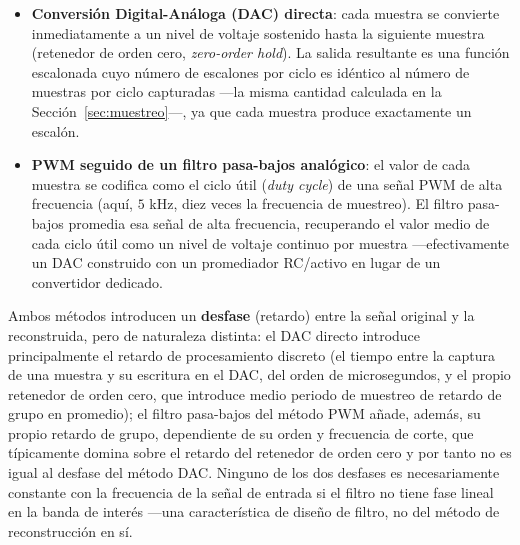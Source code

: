 \begin{itemize}
\item \textbf{Conversión Digital-Análoga (DAC) directa}: cada muestra se convierte inmediatamente a un nivel de voltaje sostenido hasta la siguiente muestra (retenedor de orden cero, \emph{zero-order hold}). La salida resultante es una función escalonada cuyo número de escalones por ciclo es idéntico al número de muestras por ciclo capturadas —la misma cantidad calculada en la Sección~\ref{sec:muestreo}—, ya que cada muestra produce exactamente un escalón.
\item \textbf{PWM seguido de un filtro pasa-bajos analógico}: el valor de cada muestra se codifica como el ciclo útil (\emph{duty cycle}) de una señal PWM de alta frecuencia (aquí, $5$ kHz, diez veces la frecuencia de muestreo). El filtro pasa-bajos promedia esa señal de alta frecuencia, recuperando el valor medio de cada ciclo útil como un nivel de voltaje continuo por muestra —efectivamente un DAC construido con un promediador RC/activo en lugar de un convertidor dedicado.
\end{itemize}

Ambos métodos introducen un \textbf{desfase} (retardo) entre la señal original y la reconstruida, pero de naturaleza distinta: el DAC directo introduce principalmente el retardo de procesamiento discreto (el tiempo entre la captura de una muestra y su escritura en el DAC, del orden de microsegundos, y el propio retenedor de orden cero, que introduce medio periodo de muestreo de retardo de grupo en promedio); el filtro pasa-bajos del método PWM añade, además, su propio retardo de grupo, dependiente de su orden y frecuencia de corte, que típicamente domina sobre el retardo del retenedor de orden cero y por tanto no es igual al desfase del método DAC. Ninguno de los dos desfases es necesariamente constante con la frecuencia de la señal de entrada si el filtro no tiene fase lineal en la banda de interés —una característica de diseño de filtro, no del método de reconstrucción en sí.
